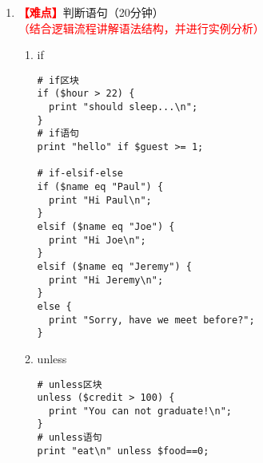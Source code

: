 \documentclass{TIJMUjiaoanLL}
\begin{document}
\begin{enumerate}
\begin{verbatim}
# 删除变量末尾的（多个）换行符，返回删除的换行符的个数
chomp $name;
chomp @authors;

# joining a number of strings togother with a colon delimiter
$fields = join ':', $data_field1, $data_field2, $data_field3;

# splitting a string into substrings
($field1, $field2) = split /:/, 'Hello:World', 2;
# splitting a scalar and creating an array
@fields = split /:/, $raw_data;

# open the file and slurp its contents into an array
# and then close the file
open(FILE, "/etc/passwd");
@filedata = <FILE>;
close(FILE);

open my $IN, '<', $file_in or die "$0 : failed to open
  input file '$file_in' : $!\n";
while(<$IN>){
  chomp;
  actions;
}
close $IN or warn "$0 : failed to close input file
  '$file_in' : $!\n";

# Global variable $name is given a name
$name = "Paul";
# Enter our loop
foreach (@filedata) {
  # declare a new variable for just the loop
    my $current_file;
    # create a local version of name to temporarily
    # assign values within the loop to
    local $name；
    ...
}
\end{verbatim}
  \vspace*{-10pt}


\otherTail
\newpage
\otherHeader


  \item \textcolor{red}{\textbf{【难点】}}判断语句（20分钟）\textcolor{red}{（结合逻辑流程讲解语法结构，并进行实例分析）}
    \begin{enumerate}
      \item if
\vspace*{-3pt}
\begin{verbatim}
# if区块
if ($hour > 22) {
  print "should sleep...\n";
}
# if语句
print "hello" if $guest >= 1;

# if-elsif-else
if ($name eq "Paul") {
  print "Hi Paul\n";
}
elsif ($name eq "Joe") {
  print "Hi Joe\n";
}
elsif ($name eq "Jeremy") {
  print "Hi Jeremy\n";
}
else {
  print "Sorry, have we meet before?";
}
\end{verbatim}
\vspace*{-3pt}
      \item unless
\vspace*{-13pt}
\begin{multicols}{2}
\begin{verbatim}
# unless区块
unless ($credit > 100) {
  print "You can not graduate!\n";
}
# unless语句
print "eat\n" unless $food==0;


\end{verbatim}
\end{multicols}
\end{enumerate}
\end{enumerate}
\end{document}
